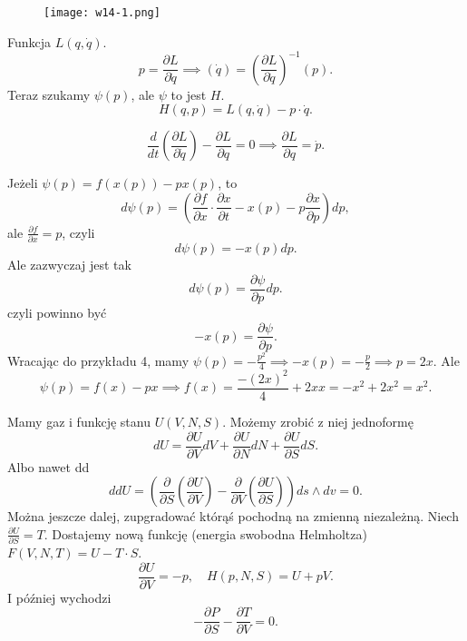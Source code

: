 \documentclass[../main.tex]{subfiles}
\begin{document}
\begin{figure}[h]
    \centering
    \texttt{[image: w14-1.png]}
\end{figure}

\begin{przyklad}
    Funkcja $L(q,\dot{q})$.
     \[
         p = \frac{\partial L}{\partial \dot{q}} \implies (\dot{q}) = \left( \frac{\partial L}{\partial \dot{q}}  \right) ^{-1} (p)
    .\]
Teraz szukamy $\psi(p)$, ale $\psi$ to jest $H$.
\[
    H(q,p) = L(q,\dot{q}) - p\cdot \dot{q}
.\]
\end{przyklad}
\begin{przyklad}
    \[
        \frac{d}{dt}\left( \frac{\partial L}{\partial \dot{q}}  \right) - \frac{\partial L}{\partial q} = 0 \implies \frac{\partial L}{\partial q} = \dot{p}
    .\]
\end{przyklad}
Jeżeli $\psi(p) = f(x(p)) - px(p)$, to
\[
    d\psi(p) = \left(\frac{\partial f}{\partial x} \cdot \frac{\partial x}{\partial t} - x(p) - p \frac{\partial x}{\partial p} \right)dp
,\]
ale $\frac{\partial f}{\partial x} = p$, czyli
\[
    d \psi(p) = -x(p) dp
.\]
Ale zazwyczaj jest tak
\[
    d\psi(p) = \frac{\partial \psi}{\partial p} dp
.\]
czyli powinno być
\[
    -x(p) = \frac{\partial \psi}{\partial p}
.\]
Wracając do przykładu 4, mamy $\psi(p) = -\frac{p^2}{4} \implies -x(p) = -\frac{p}{2} \implies p = 2x$.
Ale
\[
    \psi(p) = f(x) - px \implies f(x) = \frac{-(2x)^2}{4}+ 2x x = -x^2 + 2x^2 = x^2
.\]
\begin{przyklad}
    Mamy gaz i funkcję stanu $U(V,N,S)$. Możemy zrobić z niej jednoformę
     \[
    dU = \frac{\partial U}{\partial V} dV + \frac{\partial U}{\partial N} dN + \frac{\partial U}{\partial S} dS
    .\]
Albo nawet dd
\[
    ddU = \left( \frac{\partial }{\partial S} \left( \frac{\partial U}{\partial V}  \right) - \frac{\partial }{\partial V} \left( \frac{\partial U}{\partial S}  \right)  \right) ds\land dv = 0
.\]
Można jeszcze dalej, zupgradować którąś pochodną na zmienną niezależną. Niech $\frac{\partial U}{\partial S} = T$. Dostajemy nową funkcję (energia swobodna Helmholtza) $F(V,N,T) = U - T\cdot S$.
\[
    \frac{\partial U}{\partial V} = -p,\quad H(p,N,S) = U + pV
.\]
I później wychodzi
\[
    - \frac{\partial P}{\partial S} - \frac{\partial T}{\partial V} = 0
.\]
\end{przyklad}
\end{document}
